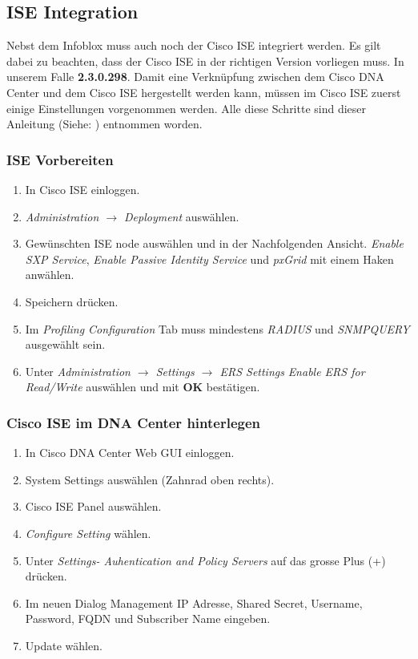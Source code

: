 \subsection{ISE Integration}
Nebst dem Infoblox muss auch noch der Cisco ISE integriert werden. Es gilt dabei zu beachten, dass der Cisco ISE in der richtigen Version vorliegen muss. In unserem Falle \textbf{2.3.0.298}.
Damit eine Verknüpfung zwischen dem Cisco DNA Center und dem Cisco ISE hergestellt werden kann, müssen im Cisco ISE zuerst einige Einstellungen vorgenommen werden. 
Alle diese Schritte sind dieser Anleitung (Siehe: \cite{cisco-dna-appliance-installation-guide-release-1-chapter-post-installation-task}) entnommen worden.

\subsubsection{ISE Vorbereiten}

\begin{enumerate}
	\item In Cisco ISE einloggen.
	\item \textit{Administration $\rightarrow$ Deployment} auswählen.
	\item Gewünschten ISE node auswählen und in der Nachfolgenden Ansicht. \textit{Enable SXP Service}, \textit{Enable Passive Identity Service} und \textit{pxGrid} mit einem Haken anwählen. 
	\item Speichern drücken.
	\item Im \textit{Profiling Configuration} Tab muss mindestens \textit{RADIUS} und \textit{SNMPQUERY} ausgewählt sein. 
	\item Unter \textit{Administration $\rightarrow$ Settings $\rightarrow$ ERS Settings} \textit{Enable ERS for Read/Write} auswählen und mit \textbf{OK} bestätigen. 
\end{enumerate}

\subsubsection{Cisco ISE im DNA Center hinterlegen}
\begin{enumerate}
	\item In Cisco DNA Center Web GUI einloggen.
	\item System Settings auswählen (Zahnrad oben rechts).
	\item Cisco ISE Panel auswählen.
	\item \textit{Configure Setting} wählen.
	\item Unter \textit{Settings- Auhentication and Policy Servers} auf das grosse Plus (+) drücken. 
	\item Im neuen Dialog Management IP Adresse, Shared Secret, Username, Password, FQDN und  Subscriber Name eingeben. 
	\item Update wählen. 
\end{enumerate}

